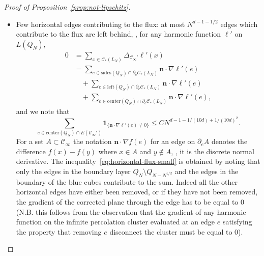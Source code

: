 \documentclass[12pt]{amsart}
\numberwithin{equation}{section}
\begin{document}
\begin{proof}[Proof of Proposition~\ref{prop:not-lipschitz}]
\begin{itemize}
			In both cases, we have found a path connecting $x$ to one of the blue cubes on the boundary of $Q_x$ which lies inside $\mathscr{C}'_{\infty}$ and has length smaller than $C N^{1/2}$. We may use the same argument to find a path connecting $x + e_1$ to one of the blue cubes on the boundary of $Q_x$. Finally, using the well-connectedness of the blue cubes (and the fact that we did not remove edges in this region), we may connect any pair of blue cubes on the boundary of the box $Q_x$ using at most $C N^{1/(10d)} N^{d/(10d)^2} \leq C N^{1/2}$ vertices.
			\item Few horizontal edges contributing to the flux: at most $N^{d-1-1/2}$ edges which contribute to the flux are left behind, \ie,
			for any harmonic function $\ell'$ on $L(Q_N)$,
			\begin{equation} \label{eq:divergence-theorem-flux}
				\begin{aligned}
					0 &= \sum_{x \in \mathscr{C}_*(L_N)} \Delta_{\mathscr{C}_{\infty}'} \ell'(x) \\
					&= \sum_{e \in \mathrm{sides}(Q_N) \cap \partial_e \mathscr{C}_*(L_N)} \mathbf{n} \cdot \nabla \ell'(e)  \\
					& \quad + \sum_{e \in \mathrm{left}(Q_N)\cap \partial_e \mathscr{C}_*(L_N)} \mathbf{n} \cdot \nabla \ell'(e)    \\
					& \quad + \sum_{e \in \mathrm{center}(Q_N)\cap \partial_e \mathscr{C}_*(L_N)} \mathbf{n} \cdot \nabla \ell'(e),
				\end{aligned}
			\end{equation}
			and we note that
			\begin{equation} \label{eq:horizontal-flux-small}
				\sum_{e \in \mathrm{center}(Q_N) \cap E \left( \mathscr{C}_\infty' \right)} \mathbf{1}_{\{\mathbf{n} \cdot \nabla \ell'(e)   \neq 0 \}} \leq C N^{d - 1- 1/(10d)+ 1/(10d)^2}.
			\end{equation}
			For a set $A \subset \mathscr{C}_{\infty}$ the notation $\mathbf{n} \cdot \nabla f(e)$ for an edge on $\partial_e A$ denotes the difference  $f(x) - f(y)$
			where $x \in A$ and $y \not \in A$, \ie, it is the discrete normal derivative. The inequality~\eqref{eq:horizontal-flux-small} is obtained by noting that only the edges in the boundary layer $Q_N \setminus Q_{N - N^{1/d}}$ and the edges in the boundary of the blue cubes contribute to the sum. Indeed all the other horizontal edges have either been removed, or if they have not been removed, the gradient of the corrected plane through the edge has to be equal to $0$ (N.B. this follows from the observation that the gradient of any harmonic function on the infinite percolation cluster evaluated at an edge $e$ satisfying the property that removing $e$ disconnect the cluster must be equal to $0$).
		\end{itemize}
		\medskip
		

\end{proof}
\end{document}
